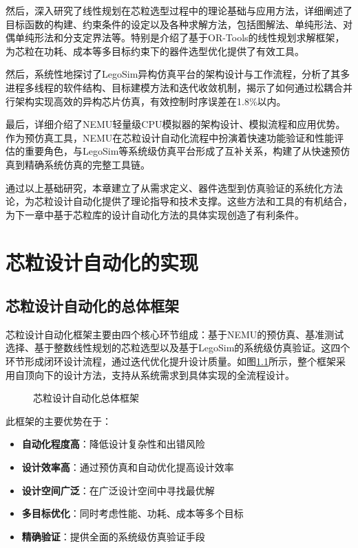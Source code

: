 \documentclass[bachelor]{thesis-uestc}
\begin{document}
然后，深入研究了线性规划在芯粒选型过程中的理论基础与应用方法，详细阐述了目标函数的构建、约束条件的设定以及各种求解方法，包括图解法、单纯形法、对偶单纯形法和分支定界法等。特别是介绍了基于OR-Tools的线性规划求解框架，为芯粒在功耗、成本等多目标约束下的器件选型优化提供了有效工具。

然后，系统性地探讨了LegoSim异构仿真平台的架构设计与工作流程，分析了其多进程多线程的软件结构、目标建模方法和迭代收敛机制，揭示了如何通过松耦合并行架构实现高效的异构芯片仿真，有效控制时序误差在1.8\%以内。

最后，详细介绍了NEMU轻量级CPU模拟器的架构设计、模拟流程和应用优势。作为预仿真工具，NEMU在芯粒设计自动化流程中扮演着快速功能验证和性能评估的重要角色，与LegoSim等系统级仿真平台形成了互补关系，构建了从快速预仿真到精确系统仿真的完整工具链。

通过以上基础研究，本章建立了从需求定义、器件选型到仿真验证的系统化方法论，为芯粒设计自动化提供了理论指导和技术支撑。这些方法和工具的有机结合，为下一章中基于芯粒库的设计自动化方法的具体实现创造了有利条件。





\chapter{芯粒设计自动化的实现}

\section{芯粒设计自动化的总体框架}

芯粒设计自动化框架主要由四个核心环节组成：基于NEMU的预仿真、基准测试选择、基于整数线性规划的芯粒选型以及基于LegoSim的系统级仿真验证。这四个环节形成闭环设计流程，通过迭代优化提升设计质量。如图\ref{fig:framework}所示，整个框架采用自顶向下的设计方法，支持从系统需求到具体实现的全流程设计。

\begin{figure}[htbp]
    \caption{芯粒设计自动化总体框架}
    \label{fig:framework}
\end{figure}

此框架的主要优势在于：
\begin{itemize}
    \item \textbf{自动化程度高}：降低设计复杂性和出错风险
    \item \textbf{设计效率高}：通过预仿真和自动优化提高设计效率
    \item \textbf{设计空间广泛}：在广泛设计空间中寻找最优解
    \item \textbf{多目标优化}：同时考虑性能、功耗、成本等多个目标
    \item \textbf{精确验证}：提供全面的系统级仿真验证手段
\end{itemize}
\end{document}
